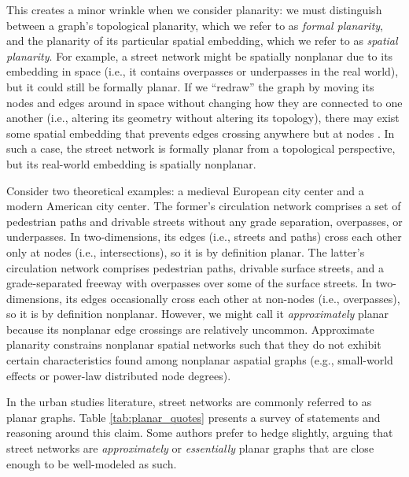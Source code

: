 \documentclass[Afour,sageh,times]{sagej}
\begin{document}
This creates a minor wrinkle when we consider planarity: we must distinguish between a graph's topological planarity, which we refer to as \emph{formal planarity}, and the planarity of its particular spatial embedding, which we refer to as \emph{spatial planarity}. For example, a street network might be spatially nonplanar due to its embedding in space (i.e., it contains overpasses or underpasses in the real world), but it could still be formally planar. If we \enquote{redraw} the graph by moving its nodes and edges around in space without changing how they are connected to one another (i.e., altering its geometry without altering its topology), there may exist some spatial embedding that prevents edges crossing anywhere but at nodes \citep[p.~6]{barthelemy_morphogenesis_2017}. In such a case, the street network is formally planar from a topological perspective, but its real-world embedding is spatially nonplanar.

Consider two theoretical examples: a medieval European city center and a modern American city center. The former's circulation network comprises a set of pedestrian paths and drivable streets without any grade separation, overpasses, or underpasses. In two-dimensions, its edges (i.e., streets and paths) cross each other only at nodes (i.e., intersections), so it is by definition planar. The latter's circulation network comprises pedestrian paths, drivable surface streets, and a grade-separated freeway with overpasses over some of the surface streets. In two-dimensions, its edges occasionally cross each other at non-nodes (i.e., overpasses), so it is by definition nonplanar. However, we might call it \emph{approximately} planar because its nonplanar edge crossings are relatively uncommon. Approximate planarity constrains nonplanar spatial networks such that they do not exhibit certain characteristics found among nonplanar aspatial graphs (e.g., small-world effects or power-law distributed node degrees).

In the urban studies literature, street networks are commonly referred to as planar graphs. Table \ref{tab:planar_quotes} presents a survey of statements and reasoning around this claim. Some authors prefer to hedge slightly, arguing that street networks are \emph{approximately} or \emph{essentially} planar graphs that are close enough to be well-modeled as such.
\end{document}
